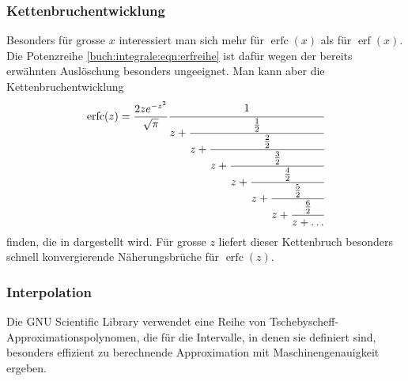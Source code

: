 \subsubsection{Kettenbruchentwicklung}
Besonders für grosse $x$ interessiert man sich mehr für
$\operatorname{erfc}(x)$ als für $\operatorname{erf}(x)$.
Die Potenzreihe \eqref{buch:integrale:eqn:erfreihe} ist
dafür wegen der bereits erwähnten Auslöschung besonders ungeeignet.
Man kann aber die Kettenbruchentwicklung 
\begin{equation}
\operatorname{erfc}(z)
=
\frac{2ze^{-z^2}}{\sqrt{\pi}}
\cfrac{1}{
z+\cfrac{\frac12}{
z+\cfrac{\frac22}{
z+\cfrac{\frac32}{
z+\cfrac{\frac42}{
z+\cfrac{\frac52}{
z+\cfrac{\frac62}{
z+\dots}}}}}}}
\end{equation}
finden, die in \cite[p.~175]{buch:pade} dargestellt wird.
Für grosse $z$ liefert dieser Kettenbruch besonders schnell konvergierende
Näherungsbrüche für $\operatorname{erfc}(z)$.

\subsubsection{Interpolation}
Die GNU Scientific Library \cite{buch:library:gsl} verwendet eine Reihe von
Tschebyscheff-Approximationspolynomen, die für die Intervalle, in denen
sie definiert sind, besonders effizient zu berechnende Approximation
mit Maschinengenauigkeit ergeben.
